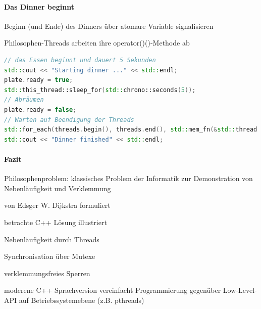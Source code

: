 \documentclass[10pt]{article}
\begin{document}
\paragraph{Das Dinner beginnt}

\begin{itemize*}
  \item Beginn (und Ende) des Dinners über atomare Variable signalisieren
  \item Philosophen-Threads arbeiten ihre operator()()-Methode ab
\end{itemize*}
\begin{lstlisting}[language=C++]
// das Essen beginnt und dauert 5 Sekunden
std::cout << "Starting dinner ..." << std::endl;
plate.ready = true;
std::this_thread::sleep_for(std::chrono::seconds(5));
// Abräumen
plate.ready = false;
// Warten auf Beendigung der Threads
std::for_each(threads.begin(), threads.end(), std::mem_fn(&std::thread::join));
std::cout << "Dinner finished" << std::endl;
\end{lstlisting}

\paragraph{Fazit}

\begin{itemize*}
  \item Philosophenproblem: klassisches Problem der Informatik zur Demonstration von Nebenläufigkeit und Verklemmung
  \item von Edsger W. Dijkstra formuliert
  \item betrachte C++ Lösung illustriert
  \begin{itemize*}
    \item Nebenläufigkeit durch Threads
    \item Synchronisation über Mutexe
    \item verklemmungsfreies Sperren
  \end{itemize*}
  \item moderene C++ Sprachversion vereinfacht Programmierung gegenüber Low-Level-API auf Betriebssystemebene (z.B. pthreads)
\end{itemize*}
\end{document}

